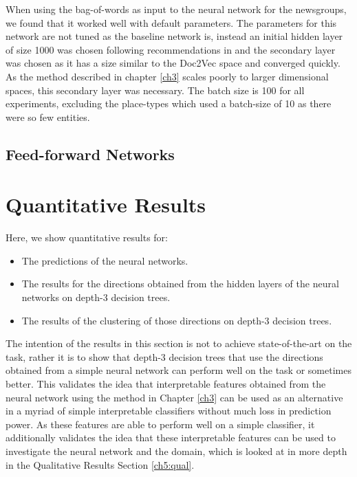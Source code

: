 When using the bag-of-words as input to the neural network for the newsgroups, we found that it worked well with default parameters.  The parameters for this network are not tuned as the baseline network is, instead an initial hidden layer of size 1000 was chosen following recommendations in \cite{Nam2014a} and the secondary layer was chosen as it has a size similar to the Doc2Vec space and converged quickly. As the method described in chapter \ref{ch3} scales poorly to larger dimensional spaces, this secondary layer was necessary. The batch size is 100 for all experiments, excluding the place-types which used a batch-size of 10 as there were so few entities.

\subsection{Feed-forward Networks}


\section{Quantitative Results}

Here, we show quantitative results for:

\begin{itemize}
	\item The predictions of the neural networks.
	\item The results for the directions obtained from the hidden layers of the neural networks on depth-3 decision trees.
	\item The results of the clustering of those directions on depth-3 decision trees.
\end{itemize}

The intention of the results in this section is not to achieve state-of-the-art on the task, rather it is to show that depth-3 decision trees that use the directions  obtained from a simple neural network  can perform well on the task or sometimes better. This validates the idea that  interpretable features obtained from the neural network using the method in Chapter \ref{ch3} can be used as an alternative in a myriad of simple interpretable classifiers without much loss in prediction power. As these features are able to perform well on a simple classifier, it additionally validates the idea that these interpretable features can be used to investigate the neural network and the domain, which is looked at in more depth in the Qualitative Results Section \ref{ch5:qual}. 

